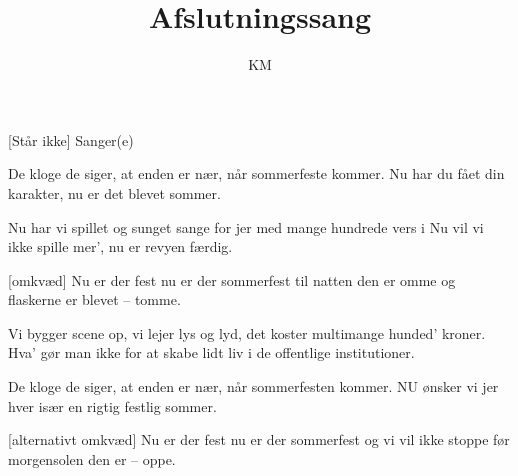 \documentclass[a4paper,11pt]{article}
\title{Afslutningssang}
\author{KM}
\begin{document}
\maketitle

\begin{roles}
[Står ikke] Sanger(e)
\end{roles}


\begin{song}
%
De kloge de siger, at enden er nær,
når sommerfeste kommer.
Nu har du fået din karakter,
nu er det blevet sommer.

Nu har vi spillet og sunget sange for jer
med mange hundrede vers i
Nu vil vi ikke spille mer',
nu er revyen færdig.

[omkvæd]%
Nu er der fest
nu er der sommerfest
til natten den er omme
og flaskerne er blevet -- tomme.

%
Vi bygger scene op, vi lejer lys og lyd,
det koster multimange hunded' kroner.
Hva' gør man ikke for at skabe lidt liv
i de offentlige institutioner.

De kloge de siger, at enden er nær,
når sommerfesten kommer.
NU ønsker vi jer hver især
en rigtig festlig sommer.

[alternativt omkvæd]
Nu er der fest
nu er der sommerfest
og vi vil ikke stoppe
før morgensolen den er -- oppe.
\end{song}
\end{document}
